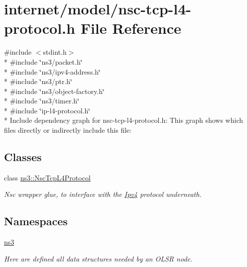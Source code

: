 \hypertarget{nsc-tcp-l4-protocol_8h}{}\section{internet/model/nsc-\/tcp-\/l4-\/protocol.h File Reference}
\label{nsc-tcp-l4-protocol_8h}
{\ttfamily \#include $<$stdint.\+h$>$}\\*
{\ttfamily \#include \char`\"{}ns3/packet.\+h\char`\"{}}\\*
{\ttfamily \#include \char`\"{}ns3/ipv4-\/address.\+h\char`\"{}}\\*
{\ttfamily \#include \char`\"{}ns3/ptr.\+h\char`\"{}}\\*
{\ttfamily \#include \char`\"{}ns3/object-\/factory.\+h\char`\"{}}\\*
{\ttfamily \#include \char`\"{}ns3/timer.\+h\char`\"{}}\\*
{\ttfamily \#include \char`\"{}ip-\/l4-\/protocol.\+h\char`\"{}}\\*
Include dependency graph for nsc-\/tcp-\/l4-\/protocol.h\+:
This graph shows which files directly or indirectly include this file\+:
\subsection*{Classes}
\begin{DoxyCompactItemize}
\item 
class \hyperlink{classns3_1_1NscTcpL4Protocol}{ns3\+::\+Nsc\+Tcp\+L4\+Protocol}
\begin{DoxyCompactList}\small\item\em Nsc wrapper glue, to interface with the \hyperlink{classns3_1_1Ipv4}{Ipv4} protocol underneath. \end{DoxyCompactList}\end{DoxyCompactItemize}
\subsection*{Namespaces}
\begin{DoxyCompactItemize}
\item 
 \hyperlink{namespacens3}{ns3}
\begin{DoxyCompactList}\small\item\em Here are defined all data structures needed by an O\+L\+SR node. \end{DoxyCompactList}\end{DoxyCompactItemize}
